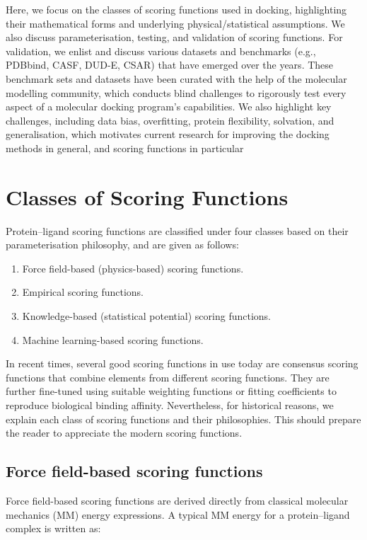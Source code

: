 \documentclass[12pt]{article}
\begin{document}
Here, we focus on the classes of scoring functions used in docking, highlighting their mathematical forms and underlying physical/statistical assumptions. We also discuss parameterisation, testing, and validation of scoring functions. For validation, we enlist and discuss various datasets and benchmarks (e.g., PDBbind, CASF, DUD-E, CSAR) that have emerged over the years. These benchmark sets and datasets have been curated with the help of the molecular modelling community, which conducts blind challenges to rigorously test every aspect of a molecular docking program's capabilities. We also highlight key challenges, including data bias, overfitting, protein flexibility, solvation, and generalisation, which motivates current research for improving the docking methods in general, and scoring functions in particular\cite{CH3_Wang2017} 

\section{Classes of Scoring Functions}
 Protein--ligand scoring functions are classified under four classes based on their parameterisation philosophy, and are given as follows:

\begin{enumerate}
    \item Force field-based (physics-based) scoring functions.
    \item Empirical scoring functions.
    \item Knowledge-based (statistical potential) scoring functions.
    \item Machine learning-based scoring functions.
\end{enumerate}

In recent times, several good scoring functions in use today are consensus scoring functions that combine elements from different scoring functions. They are further fine-tuned using suitable weighting functions or fitting coefficients to reproduce biological binding affinity. Nevertheless, for historical reasons, we explain each class of scoring functions and their philosophies. This should prepare the reader to appreciate the modern scoring functions. 

\subsection{Force field-based scoring functions}
Force field-based scoring functions are derived directly from classical molecular mechanics (MM) energy expressions. A typical MM energy for a protein--ligand complex is written as:
\end{document}
